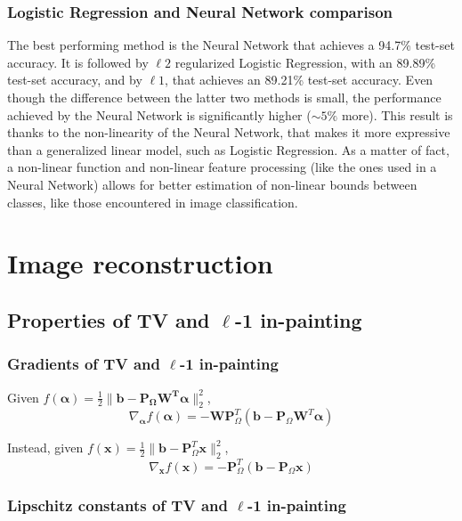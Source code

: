 \documentclass[12pt]{article}
\begin{document}
\subsubsection{Logistic Regression and Neural Network comparison}
The best performing method is the Neural Network that achieves a 94.7\% test-set accuracy. It is followed by $\ell2$ regularized Logistic Regression, with an 89.89\% test-set accuracy, and by $\ell1$, that achieves an 89.21\% test-set accuracy. Even though the difference between the latter two methods is small, the performance achieved by the Neural Network is significantly higher ($\sim5\%$ more). This result is thanks to the non-linearity of the Neural Network, that makes it more expressive than a generalized linear model, such as Logistic Regression. As a matter of fact, a non-linear function and non-linear feature processing (like the ones used in a Neural Network) allows for better estimation of non-linear bounds between classes, like those encountered in image classification.

\section{Image reconstruction}

\subsection{Properties of TV and \texorpdfstring{$\ell$}{Lg}-1 in-painting}

\subsubsection{Gradients of TV and \texorpdfstring{$\ell$}{Lg}-1 in-painting}
Given $f(\bm{\alpha}) = \frac{1}{2} \lVert \mathbf{b} - \mathbf{P_{\Omega}\mathbf{W}^T\bm{\alpha}} \rVert_{2}^{2}$,
\begin{equation}
    \nabla_{\bm{\alpha}}f(\bm{\alpha}) = - \mathbf{W} \mathbf{P}_{\Omega}^T (\mathbf{b} - \mathbf{P}_{\Omega} \mathbf{W} ^T \bm{\alpha})
\end{equation}

Instead, given $f(\mathbf{x}) = \frac{1}{2} \lVert \mathbf{b} - \mathbf{P}_{\Omega}^T \mathbf{x} \rVert_{2}^{2}$,
\begin{equation}
    \nabla_{\bm{x}}f(\bm{x}) = - \mathbf{P}_{\Omega}^T(\mathbf{b} - \mathbf{P}_{\Omega} \mathbf{x})
\end{equation}

\subsubsection{Lipschitz constants of TV and \texorpdfstring{$\ell$}{Lg}-1 in-painting}
\end{document}
